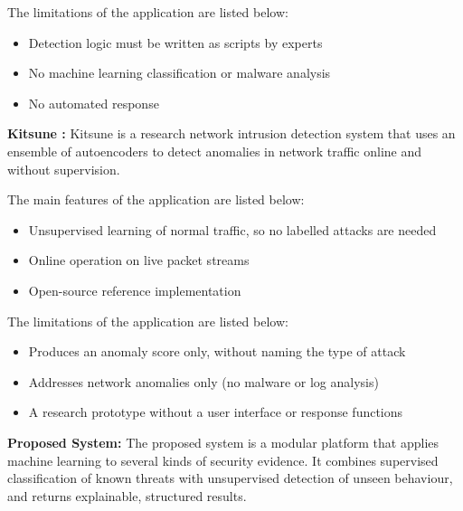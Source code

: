 The limitations of the application are listed below:
\begin{itemize}
    \setlength{\itemsep}{1pt}
    \setlength{\parskip}{0pt}
    \setlength{\parsep}{0pt}
    \item Detection logic must be written as scripts by experts
    \item No machine learning classification or malware analysis
    \item No automated response
\end{itemize}

\vspace{6pt}
\textbf{Kitsune \cite{mirsky2018kitsune}:} Kitsune is a research network intrusion detection system that uses an ensemble of autoencoders to detect anomalies in network traffic online and without supervision.

The main features of the application are listed below:
\begin{itemize}
    \setlength{\itemsep}{1pt}
    \setlength{\parskip}{0pt}
    \setlength{\parsep}{0pt}
    \item Unsupervised learning of normal traffic, so no labelled attacks are needed
    \item Online operation on live packet streams
    \item Open-source reference implementation
\end{itemize}

The limitations of the application are listed below:
\begin{itemize}
    \setlength{\itemsep}{1pt}
    \setlength{\parskip}{0pt}
    \setlength{\parsep}{0pt}
    \item Produces an anomaly score only, without naming the type of attack
    \item Addresses network anomalies only (no malware or log analysis)
    \item A research prototype without a user interface or response functions
\end{itemize}

\vspace{6pt}
\textbf{Proposed System:} The proposed system is a modular platform that applies machine learning to several kinds of security evidence. It combines supervised classification of known threats with unsupervised detection of unseen behaviour, and returns explainable, structured results.

